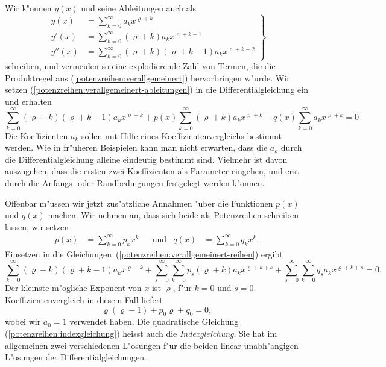 Wir k"onnen $y(x)$ und seine Ableitungen auch als
\begin{equation}
\left.
\begin{aligned}
y(x)
&=
\sum_{k=0}^\infty a_kx^{\varrho+k}
\\
y'(x)
&=
\sum_{k=0}^\infty (\varrho+k)a_kx^{\varrho+k-1}
\\
y''(x)
&=
\sum_{k=0}^\infty (\varrho+k)(\varrho+k-1)a_kx^{\varrho+k-2}
\end{aligned}
\right\}
\label{potenzreihen:verallgemeinert-ableitungen}
\end{equation}
schreiben, und vermeiden so eine explodierende Zahl von Termen, die
die Produktregel aus (\ref{potenzreihen:verallgemeinert})
hervorbringen w"urde.
Wir setzen (\ref{potenzreihen:verallgemeinert-ableitungen})
in die Differentialgleichung ein und erhalten
\begin{equation}
\sum_{k=0}^\infty (\varrho+k)(\varrho+k-1)a_kx^{\varrho+k}
+p(x)
\sum_{k=0}^\infty (\varrho+k)a_kx^{\varrho+k}
+q(x)
\sum_{k=0}^\infty a_kx^{\varrho+k}
=0
\label{potenzreihen:verallgemeinert-reihen}
\end{equation}
Die Koeffizienten $a_k$ sollen mit Hilfe eines Koeffizientenvergleichs
bestimmt werden.
Wie in fr"uheren Beispielen kann man nicht erwarten, dass die $a_k$
durch die Differentialgleichung alleine eindeutig bestimmt sind.
Vielmehr ist davon auszugehen, dass die ersten zwei Koeffizienten
als Parameter eingehen, und erst durch die Anfangs- oder Randbedingungen
festgelegt werden k"onnen.

Offenbar m"ussen wir jetzt zus"atzliche Annahmen "uber die
Funktionen $p(x)$ und $q(x)$ machen.
Wir nehmen an, dass sich beide als Potenzreihen schreiben lassen,
wir setzen
\begin{equation*}
\begin{aligned}
p(x)&=\sum_{k=0}^\infty p_kx^k&&\text{und}
&
q(x)&=\sum_{k=0}^\infty q_kx^k.
\end{aligned}
\end{equation*}
Einsetzen in die Gleichungen~(\ref{potenzreihen:verallgemeinert-reihen})
ergibt
\begin{equation*}
\sum_{k=0}^\infty (\varrho+k)(\varrho+k-1)a_kx^{\varrho+k}
+\sum_{s=0}^\infty
\sum_{k=0}^\infty p_s(\varrho+k)a_kx^{\varrho+k+s}
+
\sum_{s=0}^\infty
\sum_{k=0}^\infty q_sa_kx^{\varrho+k+s}
=0.
\end{equation*}
Der kleinste m"ogliche Exponent von $x$ ist $\varrho$, f"ur $k=0$ und $s=0$.
Koeffizientenvergleich in diesem Fall liefert
\begin{equation}
\varrho(\varrho-1)+p_0\varrho +q_0=0,
\label{potenzreihen:indexgleichung}
\end{equation}
wobei wir $a_0=1$ verwendet haben.
Die quadratische Gleichung (\ref{potenzreihen:indexgleichung}) heisst auch die
{\em Indexgleichung}.
Sie hat im allgemeinen zwei verschiedenen L"osungen f"ur die beiden
linear unabh"angigen L"osungen der Differentialgleichungen.


